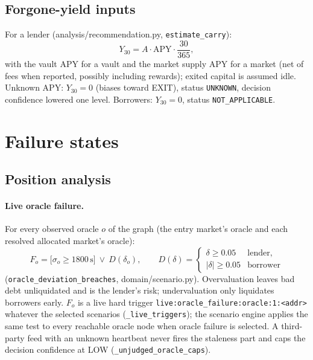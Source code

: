 \documentclass[11pt,a4paper]{article}
\newcommand{\code}[1]{\texttt{#1}}
\newcommand{\src}[1]{\textsf{\small #1}}
\begin{document}
\subsection{Forgone-yield inputs}

For a lender (\src{analysis/recommendation.py}, \code{estimate\_carry}):
\begin{equation}
Y_{30}=A\cdot\text{APY}\cdot\frac{30}{365},
\end{equation}
with the vault APY for a vault and the market supply APY for a market (net of
fees when reported, possibly including rewards); exited capital is assumed idle.
Unknown APY: $Y_{30}=0$ (biases toward EXIT), status \code{UNKNOWN}, decision
confidence lowered one level. Borrowers: $Y_{30}=0$, status \code{NOT\_APPLICABLE}.

\section{Failure states}

\subsection{Position analysis}\label{sec:unavailable}

\paragraph{Live oracle failure.} For every observed oracle $o$ of the graph
(the entry market's oracle and each resolved allocated market's oracle):
\begin{equation}
F_o=\big[\sigma_o\geq1800\,\text{s}\big]\ \lor\ D(\delta_o),\qquad
D(\delta)=\begin{cases}\delta\geq0.05 & \text{lender},\\ |\delta|\geq0.05 & \text{borrower}\end{cases}
\end{equation}
(\code{oracle\_deviation\_breaches}, \src{domain/scenario.py}). Overvaluation
leaves bad debt unliquidated and is the lender's risk; undervaluation only
liquidates borrowers early. $F_o$ is a live hard trigger
\code{live:oracle\_failure:oracle:1:<addr>} whatever the selected scenarios
(\code{\_live\_triggers}); the scenario engine applies the same test to every
reachable oracle node when oracle failure is selected. A third-party feed with an
unknown heartbeat never fires the staleness part and caps the decision confidence
at LOW (\code{\_unjudged\_oracle\_caps}).
\end{document}
